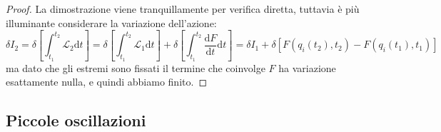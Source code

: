 \documentclass[11pt]{scrartcl}
\newcommand{\dif}{\text{d}}
\begin{document}
	\begin{proof}
		La dimostrazione viene tranquillamente per verifica diretta, tuttavia è più illuminante considerare la variazione dell'azione:
		$$\delta I_2=\delta \left[\int_{t_1}^{t_2}\mathcal{L}_2\dif t\right]=\delta \left[\int_{t_1}^{t_2}\mathcal{L}_1\dif t\right]+\delta \left[\int_{t_1}^{t_2}\frac{\dif F}{\dif t}\dif t\right]=\delta I_1 +\delta\left[F(q_i(t_2),t_2)-F(q_i(t_1),t_1)\right]$$
		ma dato che gli estremi sono fissati il termine che coinvolge $F$ ha variazione esattamente nulla, e quindi abbiamo finito.
	\end{proof}
	
	\subsection{Piccole oscillazioni}
	
\end{document}
